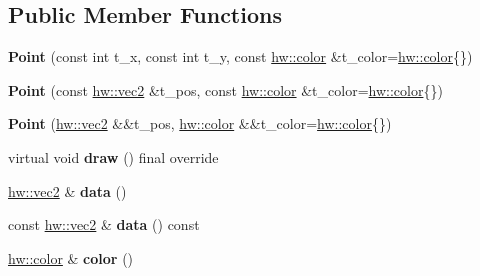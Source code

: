 \subsection*{Public Member Functions}
\begin{DoxyCompactItemize}
\item 
\mbox{\label{classdummy__api_1_1Point_ab6a9f63098caa284c09bb8dec142e0c4}} 
{\bfseries Point} (const int t\+\_\+x, const int t\+\_\+y, const \mbox{\hyperlink{structhw_1_1color}{hw\+::color}} \&t\+\_\+color=\mbox{\hyperlink{structhw_1_1color}{hw\+::color}}\{\})
\item 
\mbox{\label{classdummy__api_1_1Point_a01f90131106a6c0d1db3bbab4bae376a}} 
{\bfseries Point} (const \mbox{\hyperlink{structhw_1_1vec2}{hw\+::vec2}} \&t\+\_\+pos, const \mbox{\hyperlink{structhw_1_1color}{hw\+::color}} \&t\+\_\+color=\mbox{\hyperlink{structhw_1_1color}{hw\+::color}}\{\})
\item 
\mbox{\label{classdummy__api_1_1Point_a3b46ec570ec2df14c91916e8c9f92a2c}} 
{\bfseries Point} (\mbox{\hyperlink{structhw_1_1vec2}{hw\+::vec2}} \&\&t\+\_\+pos, \mbox{\hyperlink{structhw_1_1color}{hw\+::color}} \&\&t\+\_\+color=\mbox{\hyperlink{structhw_1_1color}{hw\+::color}}\{\})
\item 
\mbox{\label{classdummy__api_1_1Point_a81a3adfc8217ef4c6e789b4c78185085}} 
virtual void {\bfseries draw} () final override
\item 
\mbox{\label{classdummy__api_1_1Point_ab7f1e81031c98aa83e62bfb4fb238b2f}} 
\mbox{\hyperlink{structhw_1_1vec2}{hw\+::vec2}} \& {\bfseries data} ()
\item 
\mbox{\label{classdummy__api_1_1Point_abaf4fce2294e22b6c57020835eddd584}} 
const \mbox{\hyperlink{structhw_1_1vec2}{hw\+::vec2}} \& {\bfseries data} () const
\item 
\mbox{\label{classdummy__api_1_1Point_a66ef44127d5ab393c5e788c271a0ac1c}} 
\mbox{\hyperlink{structhw_1_1color}{hw\+::color}} \& {\bfseries color} ()
\item 
\mbox{\label{classdummy__api_1_1Point_a5e856f1666c196d5a727f8730b4dc60b}} 

\end{DoxyCompactItemize}
